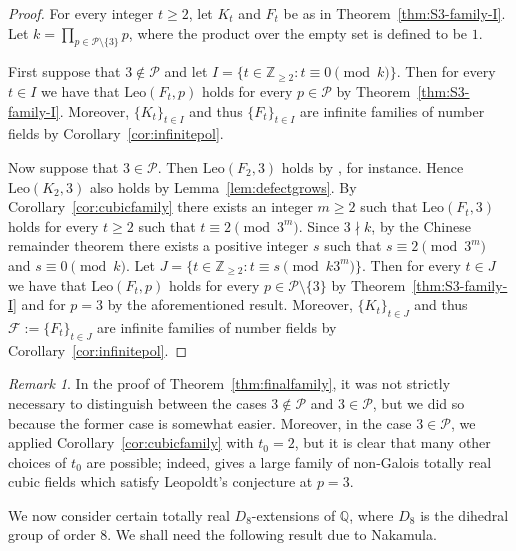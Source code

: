 \documentclass[12pt]{amsart}
\theoremstyle{plain}
\theoremstyle{remark}
\newtheorem{remark}[theorem]{Remark}
\theoremstyle{definition}
\newcommand{\Z}{\mathbb{Z}}
\newcommand{\Q}{\mathbb{Q}}
\newcommand{\Leo}{\mathrm{Leo}}
\numberwithin{equation}{section}
\begin{document}
\begin{proof}
For every integer $t \geq 2$, let $K_{t}$ and $F_{t}$ be as in Theorem~\ref{thm:S3-family-I}.
Let $k = \prod_{ p \in \mathcal{P} \setminus \{ 3 \} } p$, where the product over the empty set is defined to be $1$.
 
First suppose that $3 \notin \mathcal{P}$ and let $I = \{ t \in \Z_{\geq 2} : t \equiv 0 \pmod{k} \}$.
Then for every $t \in I$ we have that $\Leo(F_{t},p)$ holds for every $p \in \mathcal{P}$ by 
Theorem~\ref{thm:S3-family-I}.
Moreover, $\{ K_{t} \}_{t \in I}$ and thus $\{ F_{t} \}_{t \in I}$ 
are infinite families of number fields by Corollary~\ref{cor:infinitepol}.

Now suppose that $3 \in\mathcal{P}$. 
Then $\Leo(F_{2},3)$ holds by \cite[Theorem~A.2]{MR4111943}, for instance.
Hence $\Leo(K_{2},3)$ also holds by Lemma~\ref{lem:defectgrows}.
By Corollary~\ref{cor:cubicfamily} there exists an integer $m \geq 2$ such that $\Leo(F_{t},3)$ holds for every 
$t \geq 2$ such that $t \equiv 2 \pmod{3^{m}}$. 
Since $3 \nmid k$, by the Chinese remainder theorem there exists a positive integer $s$ such that
$s \equiv 2 \pmod{3^{m}}$ and $s \equiv 0 \pmod{k}$. 
Let $J = \{ t \in \Z_{\geq 2} : t \equiv s \pmod{k3^{m}} \}$.
Then for every $t \in J$ we have that $\Leo(F_{t},p)$ holds for every $p \in \mathcal{P} \setminus \{ 3 \}$ by Theorem~\ref{thm:S3-family-I} and for $p=3$ by the aforementioned result.
Moreover, $\{ K_{t} \}_{t \in J}$ and thus $\mathcal{F} := \{ F_{t} \}_{t \in J}$
are infinite families of number fields by Corollary~\ref{cor:infinitepol}.
\end{proof}

\begin{remark}
In the proof of Theorem~\ref{thm:finalfamily}, it was not strictly necessary to distinguish between the cases
$3 \notin \mathcal{P}$ and $3 \in \mathcal{P}$, but we did so because the former case is somewhat easier.
Moreover, in the case $3 \in \mathcal{P}$, we applied Corollary~\ref{cor:cubicfamily} with $t_{0}=2$, 
but it is clear that many other choices of $t_{0}$ are possible; 
indeed, \cite[Theorem A.2]{MR4111943} gives a large family
of non-Galois totally real cubic fields which satisfy Leopoldt's conjecture at $p=3$.
\end{remark}


We now consider certain totally real $D_{8}$-extensions of $\Q$, where
$D_{8}$ is the dihedral group of order $8$. We shall need the following result due to Nakamula.
\end{document}
